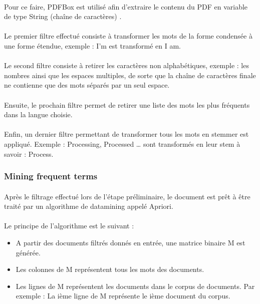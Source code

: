 \documentclass[12pt, a4paper, oneside]{book}
\begin{document}
\paragraph{} 
Pour ce faire, PDFBox est utilisé afin d'extraire le contenu du PDF en variable de type String (chaîne de caractères) \cite{apache}.
\paragraph{} 
Le premier filtre effectué consiste à transformer les mots de la forme condensée à une forme étendue, exemple : I'm est transformé en I am.
\paragraph{} 
Le second filtre consiste à retirer les caractères non alphabétiques, exemple : les nombres ainsi que les espaces multiples, de sorte que la chaîne de caractères finale ne contienne que des mots séparés par un seul espace.
\paragraph{} 
Ensuite, le prochain filtre permet de retirer une liste des mots les plus fréquents dans la langue choisie.
\paragraph{} 
Enfin, un dernier filtre permettant de transformer tous les mots en stemmer est appliqué. Exemple : Processing, Processed … sont transformés en leur stem à savoir : Process.


\subsubsection{Mining frequent terms}

\paragraph{} 
Après le filtrage effectué lors de l'étape préliminaire, le document est prêt à être traité par un algorithme de datamining appelé Apriori.\citep{apriori} \\ \\
Le principe de l'algorithme est le suivant : \\
\begin{itemize}

\item A partir des documents filtrés donnés en entrée, une matrice binaire M est générée.\\
\item Les colonnes de M représentent tous les mots des documents.\\
\item Les lignes de M représentent les documents dans le corpus de documents. Par exemple : La ième ligne de M représente le ième document du corpus.

\end{itemize}
\end{document}
